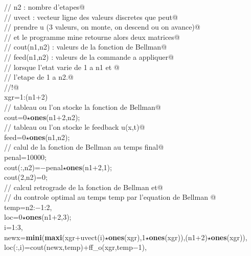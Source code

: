 {\begin{flushleft}
{\cmarg \verb@//    n2    : nombre d'etapes@\\ 
\cmarg \verb@//    uvect : vecteur ligne des valeurs discretes que peut@\\ 
\cmarg \verb@//          prendre u (3 valeurs, on monte, on descend ou on avance)@\\ 
\cmarg \verb@// et le programme mine retourne alors deux matrices@\\ 
\cmarg \verb@//    cout(n1,n2) : valeurs de la fonction de Bellman@\\ 
\cmarg \verb@//    feed(n1,n2) : valeurs de la commande a appliquer@\\ 
\cmarg \verb@//          lorsque l'etat varie de 1 a n1 et @\\ 
\cmarg \verb@//          l'etape de 1 a n2.@\\ 
\cmarg \verb@//!@\\ 
\cmarg xgr=1:(n1+2)\\ 
\cmarg \verb@// tableau ou l'on stocke la fonction de Bellman@\\ 
\cmarg cout=0$\star${\bf ones}(n1+2,n2);\\ 
\cmarg \verb@// tableau ou l'on stocke le feedback u(x,t)@\\ 
\cmarg feed=0$\star${\bf ones}(n1,n2);\\ 
\cmarg \verb@// calul de la fonction de Bellman au  temps final@\\ 
\cmarg penal=10000; \\ 
\cmarg cout(:,n2)=$-$penal$\star${\bf ones}(n1+2,1);\\ 
\cmarg cout(2,n2)=0;\\ 
\cmarg \verb@// calcul retrograde de la fonction de Bellman et@\\ 
\cmarg \verb@// du controle optimal au temps temp par l'equation de Bellman @\\ 
 temp=n2:$-$1:2,\\ 
\cmarg \hspace{0.5cm}loc=0$\star${\bf ones}(n1+2,3);\\ 
\cmarg \hspace{0.5cm}{\bf for} i=1:3,\\ 
\cmarg \hspace{1.0cm}newx={\bf mini}({\bf maxi}(xgr+uvect(i)$\star${\bf ones}(xgr),1$\star${\bf ones}(xgr)),(n1+2)$\star${\bf ones}(xgr)),\\ 
\cmarg \hspace{1.0cm}loc(:,i)=cout(newx,temp)+ff\_o(xgr,temp$-$1),\\ 
}
\end{flushleft}}
